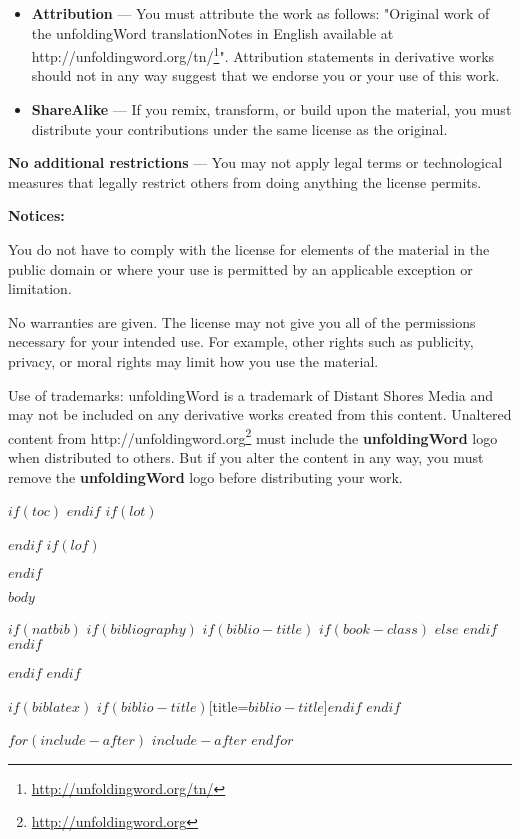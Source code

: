 \documentclass[$if(fontsize)$$fontsize$,$endif$$if(lang)$$lang$,$endif$$if(papersize)$$papersize$,$endif$$for(classoption)$$classoption$$sep$,$endfor$,openany,twoside]{$documentclass$}
\renewcommand{\href}[2]{#2\footnote{\url{#1}}}
\begin{document}
\begin{itemize}
\item
  \textbf{Attribution} ---  You must attribute the work as follows: "Original work of the unfoldingWord translationNotes in English available at 
  \href{http://unfoldingword.org/tn/}{http://unfoldingword.org/tn/}".
  Attribution statements in derivative works should not in any way suggest that we endorse you or your use of this work.
\item
  \textbf{ShareAlike} --- If you remix, transform, or build upon the material, you must distribute your contributions under the same license as the original.
\end{itemize}

\textbf{No additional restrictions} — You may not apply legal terms or technological measures that legally restrict others from doing anything the license permits.

\textbf{Notices:}

You do not have to comply with the license for elements of the material in the public domain or where your use is permitted by an applicable exception or limitation.

No warranties are given. The license may not give you all of the permissions necessary for your intended use. For example, other rights such as publicity, privacy, or moral rights may limit how you use the material.

Use of trademarks: unfoldingWord is a trademark of Distant Shores Media and may not be included on any derivative works created from this content. Unaltered content from \href{http://unfoldingword.org}{http://unfoldingword.org} must include the \textbf{unfoldingWord} logo when distributed to others. But if you alter the content in any way, you must remove the \textbf{unfoldingWord} logo before distributing your work.

\newpage

\pagestyle{regularpage}

$if(toc)$
{
  \renewcommand{\contentsname}{Table of Contents}
  \setcounter{tocdepth}{$toc-depth$}
  \hypersetup{linkcolor=$if(toccolor)$$toccolor$$else$black$endif$}
  \setcounter{secnumdepth}{-1}
  \pdfbookmark[1]{\contentsname}{toc}
  \tableofcontents
}
$endif$
$if(lot)$
  \listoftables
$endif$
$if(lof)$
  \listoffigures
$endif$
\clearpage

$body$

$if(natbib)$
  $if(bibliography)$
    $if(biblio-title)$
      $if(book-class)$
        \renewcommand\bibname{$biblio-title$}
      $else$
        \renewcommand\refname{$biblio-title$}
      $endif$
    $endif$
    
  $endif$
$endif$

$if(biblatex)$
  \printbibliography$if(biblio-title)$[title=$biblio-title$]$endif$
$endif$

$for(include-after)$
  $include-after$
$endfor$
\end{document}
